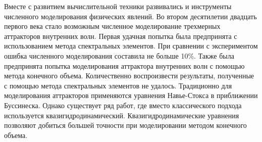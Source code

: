 Вместе с развитием вычислительной техники развивались и инструменты численного моделирования физических явлений. Во втором десятилетии двадцать первого века стало возможным численное моделирование трехмерных аттракторов внутренних волн. Первая удачная попытка была предпринята с использованием метода спектральных элементов\cite{Brouzet2016,Brouzet_2016}. При сравнении с экспериментом ошибка численного моделирования составила не больше 10\%. Также была предпринята попытка моделирования аттрактора внутренних волн с помощью метода конечного объема\cite{Brouzet2014}. Количественно воспроизвести результаты, полученные с помощью метода спектральных элементов не удалось.
Традиционно для моделирования аттракторов применяются уравнения Навье-Стокса в приближении Буссинеска. Однако существует ряд работ, где вместо классического подхода используется квазигидродинамический\cite{ElizarBook}. Квазигидродинамические уравнения позволяют добиться большей точности\cite{Kraposhin20182} при моделировании методом конечного объема.


